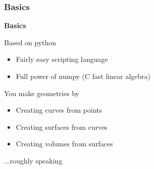 \documentclass{beamer}
\theoremstyle{plain}
\theoremstyle{definition}
\begin{document}
\begin{frame}
\frametitle{Basics}
\textbf{Basics}

Based on python 
\begin{itemize}
    \item Fairly easy scripting language
    \item Full power of numpy (C fast linear algebra)
\end{itemize}
\pause
\vspace{1cm}
You make geometries by
\begin{itemize}
    \item Creating curves from points
    \item Creating surfaces from curves
    \item Creating volumes from surfaces
\end{itemize}
...roughly speaking

\end{frame}

\end{document}
